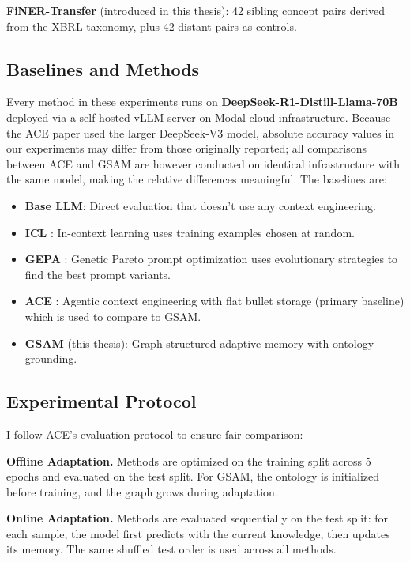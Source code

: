 \documentclass[12pt,a4paper,oneside]{article}
\begin{document}
\textbf{FiNER-Transfer} (introduced in this thesis): 42 sibling concept pairs derived from the XBRL taxonomy, plus 42 distant pairs as controls.

\subsection{Baselines and Methods}

Every method in these experiments runs on \textbf{DeepSeek-R1-Distill-Llama-70B} \citep{deepseek2024} deployed via a self-hosted vLLM server on Modal cloud infrastructure. Because the ACE paper \citep{ace2025} used the larger DeepSeek-V3 model, absolute accuracy values in our experiments may differ from those originally reported; all comparisons between ACE and GSAM are however conducted on identical infrastructure with the same model, making the relative differences meaningful. The baselines are:

\begin{itemize}[leftmargin=*]
\item \textbf{Base LLM}: Direct evaluation that doesn't use any context engineering.
\item \textbf{ICL} \citep{brown2020language}: In-context learning uses training examples chosen at random.
\item \textbf{GEPA} \citep{agrawal2025gepa}: Genetic Pareto prompt optimization uses evolutionary strategies to find the best prompt variants.
\item \textbf{ACE} \citep{ace2025}: Agentic context engineering with flat bullet storage (primary baseline) which is used to compare to GSAM.
\item \textbf{GSAM} (this thesis): Graph-structured adaptive memory with ontology grounding.
\end{itemize}

\subsection{Experimental Protocol}

I follow ACE's evaluation protocol to ensure fair comparison:

\textbf{Offline Adaptation.} Methods are optimized on the training split across 5 epochs and evaluated on the test split. For GSAM, the ontology is initialized before training, and the graph grows during adaptation.

\textbf{Online Adaptation.} Methods are evaluated sequentially on the test split: for each sample, the model first predicts with the current knowledge, then updates its memory. The same shuffled test order is used across all methods.
\end{document}
